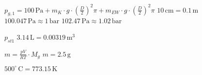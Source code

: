 \( p_{g,1} = 100 \, \text{Pa} + m_K \cdot g \cdot \left( \frac{D}{2} \right)^2 \pi + m_{EW} \cdot g \cdot \left( \frac{D}{2} \right)^2 \pi \)  
\( 10 \, \text{cm} = 0.1 \, \text{m} \)  
\( 100.047 \, \text{Pa} \approx 1 \, \text{bar} \)  
\( 102.47 \, \text{Pa} \approx 1.02 \, \text{bar} \)  

\( p_{st1} \)  
\( 3.14 \, \text{L} = 0.00319 \, \text{m}^3 \)  

\( m = \frac{pV}{RT} \cdot M_g \)  
\( m = 2.5 \, \text{g} \)  

\( 500^\circ \, \text{C} = 773.15 \, \text{K} \)